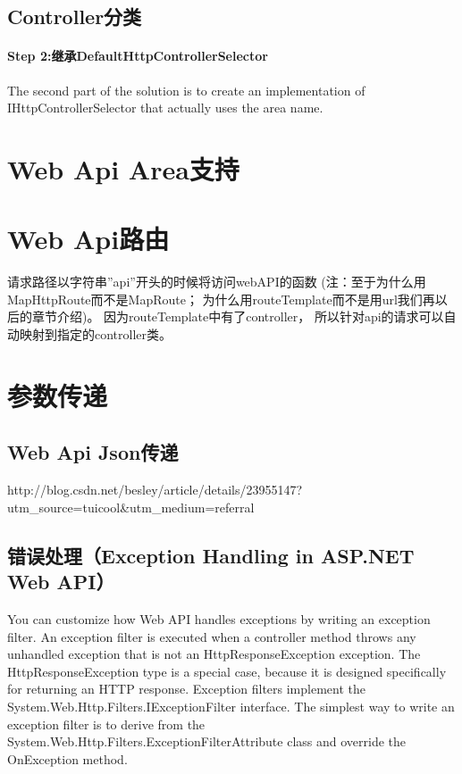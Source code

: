 \documentclass{book}
\begin{document}
\subsection{Controller分类}

\paragraph{Step 2:继承DefaultHttpControllerSelector}The second part of the solution is to create an implementation of IHttpControllerSelector that actually uses the area name. 





\section{Web Api Area支持}

\section{Web Api路由}

请求路径以字符串”api”开头的时候将访问webAPI的函数
(注：至于为什么用MapHttpRoute而不是MapRoute；
为什么用routeTemplate而不是用url我们再以后的章节介绍)。
因为routeTemplate中有了{controller}，
所以针对api的请求可以自动映射到指定的controller类。


\section{参数传递}


\subsection{Web Api Json传递}

http://blog.csdn.net/besley/article/details/23955147?utm\_source=tuicool\&utm\_medium=referral

\subsection{错误处理（Exception Handling in ASP.NET Web API）}

You can customize how Web API handles exceptions by writing an exception filter. 
An exception filter is executed when a controller method throws 
any unhandled exception that is not an HttpResponseException exception. 
The HttpResponseException type is a special case, 
because it is designed specifically for returning an HTTP response.
Exception filters implement the System.Web.Http.Filters.IExceptionFilter interface. 
The simplest way to write an exception filter is to derive from the System.Web.Http.Filters.ExceptionFilterAttribute class and override the OnException method.
\end{document}
